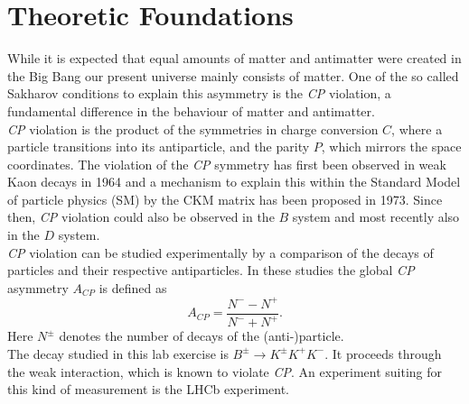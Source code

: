 \section{Theoretic Foundations}
\label{sec:Theorie}
While it is expected that equal amounts of matter and antimatter were created in the Big Bang our present universe mainly consists of matter. One of the so called Sakharov conditions to explain this asymmetry is the \textit{CP} violation, a fundamental difference in the behaviour of matter and antimatter\cite{Sakharov_1991}.\\

\textit{CP} violation is the product of the symmetries in charge conversion $C$, where a particle transitions into its antiparticle, and the parity $P$, which mirrors the space coordinates.
The violation of the \textit{CP} symmetry has first been observed in weak Kaon decays in 1964\cite{PhysRevLett.13.138} and a mechanism to explain this within the Standard Model of particle physics (SM) by the CKM matrix has been proposed in 1973\cite{10.1143/PTP.49.652}.
Since then, \textit{CP} violation could also be observed in the $B$ system\cite{Aubert_2001} and most recently also in the $D$ system\cite{PhysRevLett.122.211803}.\\

\textit{CP} violation can be studied experimentally by a comparison of the decays of particles and their respective antiparticles. In these studies the global \textit{CP} asymmetry $A_{CP}$ is defined as
\begin{equation}
  A_{CP} = \frac{N^- - N^+}{N^- + N^+}.
\end{equation}
Here $N^{\pm}$ denotes the number of decays of the (anti-)particle.\\

The decay studied in this lab exercise is $B^{\pm} \to K^{\pm} K^+ K^-$. It proceeds through the weak interaction, which is known to violate \textit{CP}. An experiment suiting for this kind of measurement is the LHCb experiment\cite{Collaboration_2008}.

